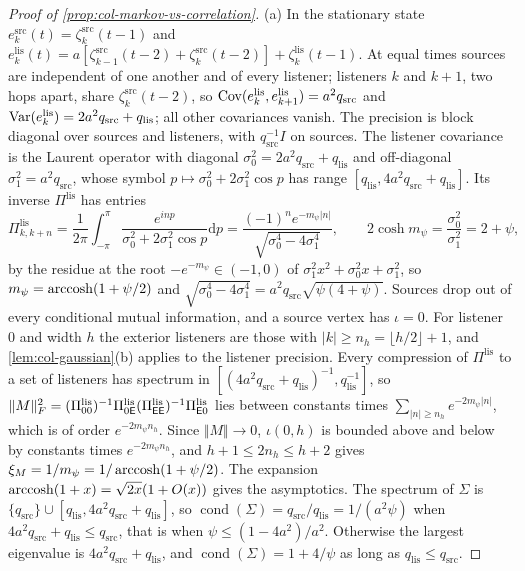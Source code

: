 \begin{proof}[Proof of \cref{prop:col-markov-vs-correlation}]
(a) In the stationary state $e^{\mathrm{src}}_k(t)=\zeta^{\mathrm{src}}_k(t-1)$ and $e^{\mathrm{lis}}_k(t)=a[\zeta^{\mathrm{src}}_{k-1}(t-2)+\zeta^{\mathrm{src}}_k(t-2)]+\zeta^{\mathrm{lis}}_k(t-1)$. At equal times sources are independent of one another and of every listener; listeners $k$ and $k+1$, two hops apart, share $\zeta^{\mathrm{src}}_k(t-2)$, so $\operatorname{Cov}(e^{\mathrm{lis}}_k,e^{\mathrm{lis}}_{k+1})=a^2q_{\mathrm{src}}$ and $\operatorname{Var}(e^{\mathrm{lis}}_k)=2a^2q_{\mathrm{src}}+q_{\mathrm{lis}}$; all other covariances vanish. The precision is block diagonal over sources and listeners, with $q_{\mathrm{src}}^{-1}I$ on sources. The listener covariance is the Laurent operator with diagonal $\sigma_0^2=2a^2q_{\mathrm{src}}+q_{\mathrm{lis}}$ and off-diagonal $\sigma_1^2=a^2q_{\mathrm{src}}$, whose symbol $p\mapsto\sigma_0^2+2\sigma_1^2\cos p$ has range $[q_{\mathrm{lis}},4a^2q_{\mathrm{src}}+q_{\mathrm{lis}}]$. Its inverse $\Pi^{\mathrm{lis}}$ has entries
\[
\Pi^{\mathrm{lis}}_{k,k+n}=\frac1{2\pi}\int_{-\pi}^{\pi}\frac{e^{inp}}{\sigma_0^2+2\sigma_1^2\cos p}\mathrm{d}p=\frac{(-1)^ne^{-m_\psi|n|}}{\sqrt{\sigma_0^4-4\sigma_1^4}},\qquad2\cosh m_\psi=\frac{\sigma_0^2}{\sigma_1^2}=2+\psi,
\]
by the residue at the root $-e^{-m_\psi}\in(-1,0)$ of $\sigma_1^2x^2+\sigma_0^2x+\sigma_1^2$, so $m_\psi=\operatorname{arccosh}(1+\psi/2)$ and $\sqrt{\sigma_0^4-4\sigma_1^4}=a^2q_{\mathrm{src}}\sqrt{\psi(4+\psi)}$. Sources drop out of every conditional mutual information, and a source vertex has $\iota=0$. For listener $0$ and width $h$ the exterior listeners are those with $|k|\ge n_h=\lfloor h/2\rfloor+1$, and \cref{lem:col-gaussian}(b) applies to the listener precision. Every compression of $\Pi^{\mathrm{lis}}$ to a set of listeners has spectrum in $[(4a^2q_{\mathrm{src}}+q_{\mathrm{lis}})^{-1},q_{\mathrm{lis}}^{-1}]$, so $\Vert M\Vert_F^2=(\Pi^{\mathrm{lis}}_{00})^{-1}\Pi^{\mathrm{lis}}_{0\mathsf{E}}(\Pi^{\mathrm{lis}}_{\mathsf{E}\mathsf{E}})^{-1}\Pi^{\mathrm{lis}}_{\mathsf{E}0}$ lies between constants times $\sum_{|n|\ge n_h}e^{-2m_\psi|n|}$, which is of order $e^{-2m_\psi n_h}$. Since $\Vert M\Vert\to0$, $\iota(0,h)$ is bounded above and below by constants times $e^{-2m_\psi n_h}$, and $h+1\le2n_h\le h+2$ gives $\xi_M=1/m_\psi=1/\operatorname{arccosh}(1+\psi/2)$. The expansion $\operatorname{arccosh}(1+x)=\sqrt{2x}(1+O(x))$ gives the asymptotics. The spectrum of $\Sigma$ is $\{q_{\mathrm{src}}\}\cup[q_{\mathrm{lis}},4a^2q_{\mathrm{src}}+q_{\mathrm{lis}}]$, so $\operatorname{cond}(\Sigma)=q_{\mathrm{src}}/q_{\mathrm{lis}}=1/(a^2\psi)$ when $4a^2q_{\mathrm{src}}+q_{\mathrm{lis}}\le q_{\mathrm{src}}$, that is when $\psi\le(1-4a^2)/a^2$. Otherwise the largest eigenvalue is $4a^2q_{\mathrm{src}}+q_{\mathrm{lis}}$, and $\operatorname{cond}(\Sigma)=1+4/\psi$ as long as $q_{\mathrm{lis}}\le q_{\mathrm{src}}$.


\end{proof}
